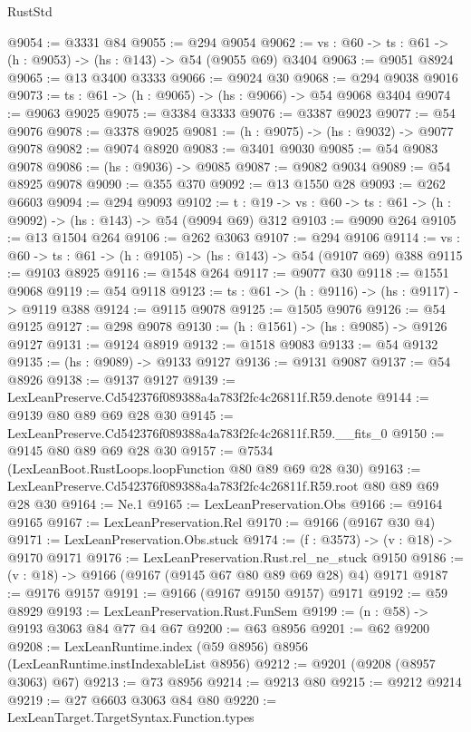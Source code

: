 \begin{lexlean}{RustStd}
\begin{coremodule}
@9054 := @3331 @84
@9055 := @294 @9054
@9062 := {vs : @60} -> {ts : @61} -> (h : @9053) -> (hs : @143) -> @54 (@9055 @69) @3404
@9063 := @9051 @8924
@9065 := @13 @3400 @3333
@9066 := @9024 @30
@9068 := @294 @9038 @9016
@9073 := {ts : @61} -> (h : @9065) -> (hs : @9066) -> @54 @9068 @3404
@9074 := @9063 @9025
@9075 := @3384 @3333
@9076 := @3387 @9023
@9077 := @54 @9076
@9078 := @3378 @9025
@9081 := (h : @9075) -> (hs : @9032) -> @9077 @9078
@9082 := @9074 @8920
@9083 := @3401 @9030
@9085 := @54 @9083 @9078
@9086 := (hs : @9036) -> @9085
@9087 := @9082 @9034
@9089 := @54 @8925 @9078
@9090 := @355 @370
@9092 := @13 @1550 @28
@9093 := @262 @6603
@9094 := @294 @9093
@9102 := {t : @19} -> {vs : @60} -> {ts : @61} -> (h : @9092) -> (hs : @143) -> @54 (@9094 @69) @312
@9103 := @9090 @264
@9105 := @13 @1504 @264
@9106 := @262 @3063
@9107 := @294 @9106
@9114 := {vs : @60} -> {ts : @61} -> (h : @9105) -> (hs : @143) -> @54 (@9107 @69) @388
@9115 := @9103 @8925
@9116 := @1548 @264
@9117 := @9077 @30
@9118 := @1551 @9068
@9119 := @54 @9118
@9123 := {ts : @61} -> (h : @9116) -> (hs : @9117) -> @9119 @388
@9124 := @9115 @9078
@9125 := @1505 @9076
@9126 := @54 @9125
@9127 := @298 @9078
@9130 := (h : @1561) -> (hs : @9085) -> @9126 @9127
@9131 := @9124 @8919
@9132 := @1518 @9083
@9133 := @54 @9132
@9135 := (hs : @9089) -> @9133 @9127
@9136 := @9131 @9087
@9137 := @54 @8926
@9138 := @9137 @9127
@9139 := LexLeanPreserve.Cd542376f089388a4a783f2fc4c26811f.R59.denote
@9144 := @9139 @80 @89 @69 @28 @30
@9145 := LexLeanPreserve.Cd542376f089388a4a783f2fc4c26811f.R59.__fits_0
@9150 := @9145 @80 @89 @69 @28 @30
@9157 := @7534 (LexLeanBoot.RustLoops.loopFunction @80 @89 @69 @28 @30)
@9163 := LexLeanPreserve.Cd542376f089388a4a783f2fc4c26811f.R59.root @80 @89 @69 @28 @30
@9164 := Ne.{1}
@9165 := LexLeanPreservation.Obs
@9166 := @9164 @9165
@9167 := LexLeanPreservation.Rel
@9170 := @9166 (@9167 @30 @4)
@9171 := LexLeanPreservation.Obs.stuck
@9174 := (f : @3573) -> (v : @18) -> @9170 @9171
@9176 := LexLeanPreservation.Rust.rel_ne_stuck @9150
@9186 := (v : @18) -> @9166 (@9167 (@9145 @67 @80 @89 @69 @28) @4) @9171
@9187 := @9176 @9157
@9191 := @9166 (@9167 @9150 @9157) @9171
@9192 := @59 @8929
@9193 := LexLeanPreservation.Rust.FunSem
@9199 := (n : @58) -> @9193 @3063 @84 @77 @4 @67
@9200 := @63 @8956
@9201 := @62 @9200
@9208 := LexLeanRuntime.index (@59 @8956) @8956 (LexLeanRuntime.instIndexableList @8956)
@9212 := @9201 (@9208 (@8957 @3063) @67)
@9213 := @73 @8956
@9214 := @9213 @80
@9215 := @9212 @9214
@9219 := @27 @6603 @3063 @84 @80
@9220 := LexLeanTarget.TargetSyntax.Function.types

\end{coremodule}
\end{lexlean}

